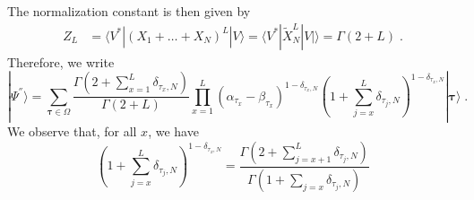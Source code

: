 \documentclass[10pt]{article}
\numberwithin{equation}{section}
\numberwithin{equation}{subsection}
\newcommand{\dt}{\;.}
\begin{document}
The normalization constant is then given by
\begin{align*}
	Z_{L}&=\langle V^{*}|(X_{1}+\ldots+X_{N})^{L}|V\rangle=\langle V^{*}|\widetilde{X}_{N}^{L}|V|\rangle=
	\Gamma(2+L)\dt
\end{align*}
Therefore, we write
\begin{equation}\label{resulEsteady}
	|\Psi^{''}\rangle= \sum_{\bm{\tau}\in \Omega}\frac{\Gamma(2+\sum_{x=1}^{L}\delta_{\tau_{x},N})}{\Gamma(2+L)}\prod_{x=1}^{L}\left(\alpha_{\tau_{x}}-\beta_{\tau_{x}}\right)^{1-\delta_{\tau_{x},N}}\left(1+\sum_{j=x}^{L}\delta_{\tau_{j},N}\right)^{1-\delta_{\tau_{x},N}}|\bm{\tau}\rangle\dt
\end{equation}
We observe that, for all $x$, we have
\begin{equation}
	\left(1+\sum_{j=x}^{L}\delta_{\tau_{j},N}\right)^{1-\delta_{\tau_{x},N}}=\frac{\Gamma(2+\sum_{j=x+1}^{L}\delta_{\tau_{j},N})}{\Gamma(1+\sum_{j=x}\delta_{\tau_{j},N})}
\end{equation}
\begin{comment}
Using the notation $\tau_{x}$, $|\bm{\tau}\rangle $ with $\bm{\tau}$, related to the one with $\bm{n}$ by \eqref{notation-change-relation}, we have 
\begin{equation}
	\prod_{a=1}^{N-1}\left((\alpha_{a}-\beta_{a})\right)^{n_{a}^{x}}\left(1+\sum_{j=x}^{L}n_{N}^{j}\right)^{n_{a}^{x}}=\left[(\alpha_{\tau_{x}}-\beta_{\tau_{x}})\left(1+\sum_{j=x}^{L}\delta_{\tau_{j},N}\right)\right]^{1-\delta_{\tau_{x},N}}
\end{equation}
and 
\begin{equation}
	\frac{\Gamma(2+\sum_{i=1}^{L}n_{N}^{i})}{\Gamma(2+L)}=\frac{\Gamma\left(2+\sum_{x=1}^{L}\delta_{\tau_{x},N}\right)}{\Gamma\left(2+L\right)}\dt
\end{equation}
Therefore we obtain
\begin{equation}
|\Psi^{''}\rangle=\sum_{\tau_{1},\ldots,\tau_{L}=1}^{N}\frac{\Gamma\left(2+\sum_{x=1}^{L}\delta_{\tau_{x},N}\right)}{\Gamma\left(2+L\right)}\prod_{x=1}^{L}\left[(\alpha_{\tau_{x}}-\beta_{\tau_{x}})\left(1+\sum_{j=x}^{L}\delta_{\tau_{j},N}\right)\right]^{1-\delta_{\tau_{x},N}}|\mathbf{\bm{\tau}}\rangle\dt
\end{equation}

\end{comment}
\end{document}
